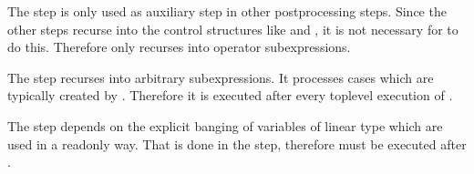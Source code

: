 The  step is only used as auxiliary step in other postprocessing steps. Since the other steps recurse into the control
structures like  and , it is not necessary for  to do this. Therefore  only recurses
into operator subexpressions.

The  step recurses into arbitrary subexpressions. It processes cases which are typically created by .
Therefore it is executed after every toplevel execution of .

The  step depends on the explicit banging of variables of linear type which are used in a readonly way. That is done 
in the  step, therefore  must be executed after .
